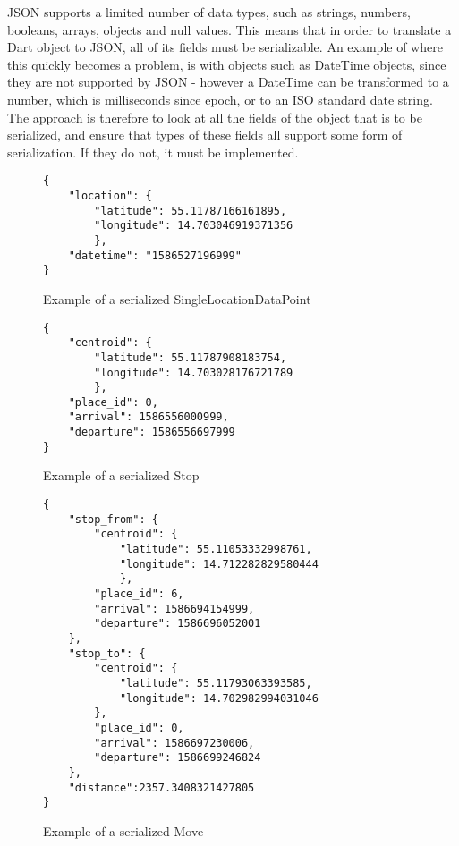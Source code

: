 JSON supports a limited number of data types, such as strings, numbers, booleans, arrays, objects and null values. This means that in order to translate a Dart object to JSON, all of its fields must be serializable. An example of where this quickly becomes a problem, is with objects such as DateTime objects, since they are not supported by JSON - however a DateTime can be transformed to a number, which is milliseconds since epoch, or to an ISO standard date string. The approach is therefore to look at all the fields of the object that is to be serialized, and ensure that types of these fields all support some form of serialization. If they do not, it must be implemented.

\begin{figure}
    \centering
\begin{verbatim}
{
    "location": {
        "latitude": 55.11787166161895,
        "longitude": 14.703046919371356
        },
    "datetime": "1586527196999"
}
\end{verbatim}
    \caption{Example of a serialized SingleLocationDataPoint}
    \label{fig:serialized_point}
\end{figure}

\begin{figure}
    \centering
\begin{verbatim}
{
    "centroid": {
        "latitude": 55.11787908183754,
        "longitude": 14.703028176721789
        },
    "place_id": 0,
    "arrival": 1586556000999,
    "departure": 1586556697999
}
\end{verbatim}
    \caption{Example of a serialized Stop}
    \label{fig:serialized_stop}
\end{figure}

\begin{figure}
    \centering
\begin{verbatim}
{
    "stop_from": {
        "centroid": {
            "latitude": 55.11053332998761,
            "longitude": 14.712282829580444
            },
        "place_id": 6,
        "arrival": 1586694154999,
        "departure": 1586696052001
    },
    "stop_to": {
        "centroid": {
            "latitude": 55.11793063393585,
            "longitude": 14.702982994031046
        },
        "place_id": 0,
        "arrival": 1586697230006,
        "departure": 1586699246824
    },
    "distance":2357.3408321427805
}
\end{verbatim}
    \caption{Example of a serialized Move}
    \label{fig:serialized_move}
\end{figure}


